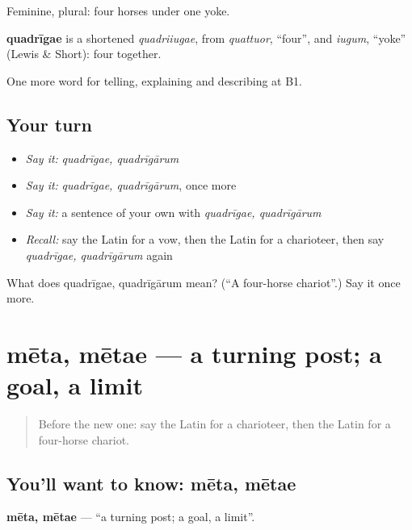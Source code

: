 Feminine, plural: four horses under one yoke.

\begin{cousinweb}
\textbf{quadrīgae} is a shortened \emph{quadriiugae}, from \emph{quattuor}, \textquotedblleft{}four\textquotedblright{}, and \emph{iugum}, \textquotedblleft{}yoke\textquotedblright{} (Lewis \& Short): four together.
\end{cousinweb}

\begin{grammarlens}[title={What you've built}]
One more word for telling, explaining and describing at B1.
\end{grammarlens}

\subsection*{Your turn}
\begin{itemize}
\raggedright
  \item \emph{Say it:} \emph{quadrīgae, quadrīgārum}
  \item \emph{Say it:} \emph{quadrīgae, quadrīgārum}, once more
  \item \emph{Say it:} a sentence of your own with \emph{quadrīgae, quadrīgārum}
  \item \emph{Recall:} say the Latin for a vow, then the Latin for a charioteer, then say \emph{quadrīgae, quadrīgārum} again
\end{itemize}

\begin{tcolorbox}[breakable,colback=teal!4,colframe=teal!35!black,title={Before you move on}]
What does quadrīgae, quadrīgārum mean? (\textquotedblleft{}A four-horse chariot\textquotedblright{}.) Say it once more.
\end{tcolorbox}
\section[mēta, mētae]{mēta, mētae — a turning post; a goal, a limit}

\label{lesson:LA-C335-meta}



\begin{quote}
Before the new one: say the Latin for a charioteer, then the Latin for a four-horse chariot.
\end{quote}

\subsection*{You'll want to know: mēta, mētae}
\textbf{mēta, mētae} — \textquotedblleft{}a turning post; a goal, a limit\textquotedblright{}.

